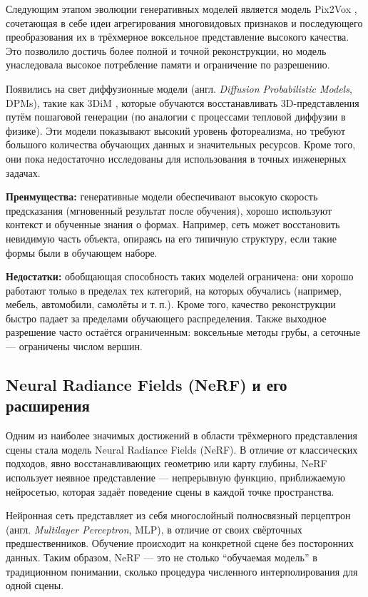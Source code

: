 Следующим этапом эволюции генеративных моделей является модель Pix2Vox
\cite{Xie_2019}, сочетающая в себе идеи агрегирования многовидовых признаков и
последующего преобразования их в трёхмерное воксельное представление высокого
качества. Это позволило достичь более полной и точной реконструкции, но модель
унаследовала высокое потребление памяти и ограничение по разрешению.

Появились на свет диффузионные модели (англ. \emph{Diffusion Probabilistic Models},
DPMs), такие как 3DiM \cite{watson2022novelviewsynthesisdiffusion}, которые
обучаются восстанавливать 3D-представления путём пошаговой генерации (по
аналогии с процессами тепловой диффузии в физике). Эти модели показывают высокий
уровень фотореализма, но требуют большого количества обучающих данных и
значительных ресурсов. Кроме того, они пока недостаточно исследованы для
использования в точных инженерных задачах.

\textbf{Преимущества:} генеративные модели обеспечивают высокую скорость
предсказания (мгновенный результат после обучения), хорошо используют контекст и
обученные знания о формах. Например, сеть может восстановить невидимую часть
объекта, опираясь на его типичную структуру, если такие формы были в обучающем
наборе.

\textbf{Недостатки:} обобщающая способность таких моделей ограничена: они хорошо
работают только в пределах тех категорий, на которых обучались (например,
мебель, автомобили, самолёты и т.\,п.). Кроме того, качество реконструкции
быстро падает за пределами обучающего распределения.  Также выходное разрешение
часто остаётся ограниченным: воксельные методы грубы, а сеточные — ограничены
числом вершин.

\subsection{Neural Radiance Fields (NeRF) и его расширения}

Одним из наиболее значимых достижений в области трёхмерного представления сцены
стала модель Neural Radiance Fields (NeRF). В отличие от классических подходов,
явно восстанавливающих геометрию или карту глубины, NeRF использует
неявное представление — непрерывную функцию, приближаемую нейросетью, которая
задаёт поведение сцены в каждой точке пространства.

Нейронная сеть представляет из себя многослойный полносвязный перцептрон (англ.
\emph{Multilayer Perceptron}, MLP), в отличие от своих свёрточных предшественников.
Обучение происходит на конкретной сцене без посторонних данных. Таким образом,
NeRF — это не столько ``обучаемая модель'' в традиционном понимании, сколько
процедура численного интерполирования для одной сцены.

